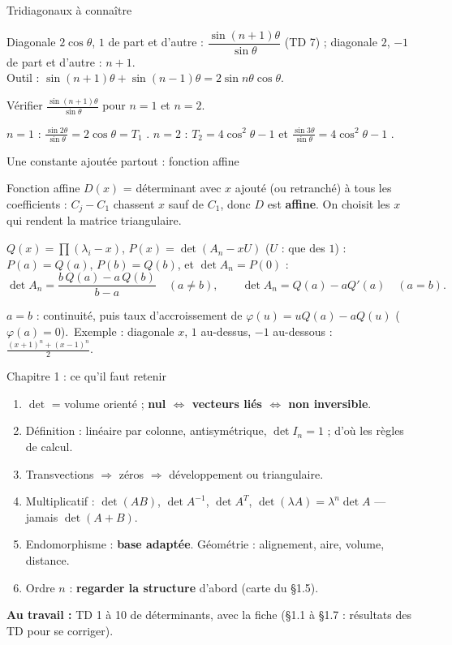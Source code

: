 \documentclass[aspectratio=169,11pt]{beamer}
\newcommand{\rep}[1]{\textcolor{Vert}{#1}}%
\begin{document}
\begin{frame}{Tridiagonaux à connaître}
\begin{FORM}[À connaître]
Diagonale $2\cos\theta$, $1$ de part et d'autre : $\dfrac{\sin(n+1)\theta}{\sin\theta}$ (TD 7) ; diagonale $2$, $-1$ de part et
d'autre : $n+1$.\\
Outil : $\sin(n+1)\theta+\sin(n-1)\theta=2\sin n\theta\cos\theta$.
\end{FORM}
\pause
\begin{ATOI}[Contrôle]
Vérifier $\frac{\sin(n+1)\theta}{\sin\theta}$ pour $n=1$ et $n=2$.
\end{ATOI}
\pause
$n=1$ : $\frac{\sin2\theta}{\sin\theta}=2\cos\theta=T_1$ \rep{\checkmark}.\qquad
$n=2$ : $T_2=4\cos^2\theta-1$ et $\frac{\sin3\theta}{\sin\theta}=4\cos^2\theta-1$ \rep{\checkmark}.
\end{frame}

\begin{frame}{Une constante ajoutée partout : fonction affine}
\begin{METH}{Fonction affine}
$D(x)$ = déterminant avec $x$ ajouté (ou retranché) à tous les coefficients : $C_j-C_1$ chassent $x$ sauf de $C_1$,
donc $D$ est \textbf{affine}. On choisit les $x$ qui rendent la matrice triangulaire.
\end{METH}
\pause
\begin{FORM}
$Q(x)=\prod(\lambda_i-x)$, $P(x)=\det(A_n-xU)$ ($U$ : que des $1$) : \ $P(a)=Q(a)$, $P(b)=Q(b)$, et $\det A_n=P(0)$ :
\[\det A_n=\frac{b\,Q(a)-a\,Q(b)}{b-a}\quad(a\neq b),\qquad\det A_n=Q(a)-aQ'(a)\quad(a=b).\]
\end{FORM}
\pause
{\small $a=b$ : continuité, puis taux d'accroissement de $\varphi(u)=uQ(a)-aQ(u)$ ($\varphi(a)=0$).\
Exemple : diagonale $x$, $1$ au-dessus, $-1$ au-dessous : $\frac{(x+1)^n+(x-1)^n}2$.}
\end{frame}

\begin{frame}{Chapitre 1 : ce qu'il faut retenir}
\begin{RETENIR}
\begin{enumerate}
\item $\det$ = volume orienté ; \textbf{nul $\iff$ vecteurs liés $\iff$ non inversible}.
\item Définition : linéaire par colonne, antisymétrique, $\det I_n=1$ ; d'où les règles de calcul.
\item Transvections $\Rightarrow$ zéros $\Rightarrow$ développement ou triangulaire.
\item Multiplicatif : $\det(AB)$, $\det A^{-1}$, $\det A^T$, $\det(\lambda A)=\lambda^n\det A$ --- jamais $\det(A+B)$.
\item Endomorphisme : \textbf{base adaptée}. Géométrie : alignement, aire, volume, distance.
\item Ordre $n$ : \textbf{regarder la structure} d'abord (carte du §1.5).
\end{enumerate}
\end{RETENIR}
\pause
\textbf{Au travail :} TD 1 à 10 de déterminants, avec la fiche (§1.1 à §1.7 : résultats des TD pour se corriger).
\end{frame}
\end{document}
